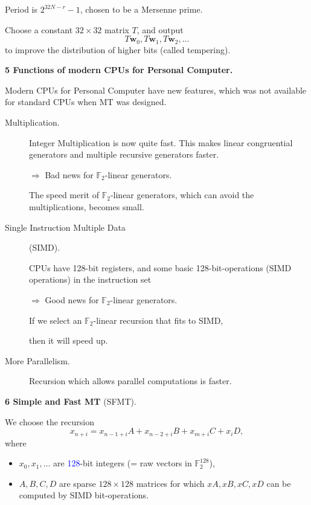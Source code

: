 \documentclass[a4j,12pt,landscape]{jarticle}
\def\F2{{\mathbb F}_2}
\def\bw{{{\mathbf w}}}
\begin{document}
Period is $2^{32N-r}-1$, chosen to be a Mersenne prime.

\vskip 5mm

Choose a constant $32\times 32$ matrix $T$, 
and output
$$
T \bw_0, T \bw_1, T \bw_2, \ldots
$$
to improve the distribution of higher bits (called tempering).

\newpage
\noindent
{\bf 5 Functions of modern CPUs for Personal Computer.}

Modern CPUs for Personal Computer have new features, 
which was not available for standard CPUs 
when MT was designed.
\begin{description}
\item[Multiplication.]
Integer Multiplication is now quite fast.
This makes linear congruential generators 
and multiple recursive generators faster.

$\Rightarrow$ 
Bad news for $\F2$-linear generators.

The speed merit of $\F2$-linear generators,
which can avoid the multiplications,
becomes small.

\newpage
\item[Single Instruction Multiple Data] (SIMD).

CPUs have 128-bit registers, and
some basic 128-bit-operations (SIMD operations) in the 
instruction set


$\Rightarrow$ 
Good news for $\F2$-linear generators.

If we select an $\F2$-linear
recursion that fits to SIMD, 

then it will speed up.

\item[More Parallelism.]

Recursion which allows parallel computations
is faster.
\end{description}

\newpage
\noindent
{\bf 6 Simple and Fast MT} (SFMT).

We choose the recursion
\[x_{n+i} = x_{n-1+i}A + x_{n-2+i}B+ x_{m+i}C + x_{i}D,\]
where 
\begin{itemize}
\item
$x_0, x_1, \ldots$ are \textcolor{blue}{128}-bit integers 
(= raw vectors in $\F2^{128}$),

\item
$A, B, C, D$ are sparse $128 \times 128$ matrices
for which $xA, xB, xC, xD$ can be computed by
SIMD bit-operations.
\end{itemize}
\end{document}

